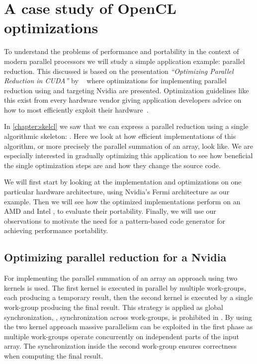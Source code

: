\section{A case study of OpenCL optimizations}
\label{sec:reduce:case-study}
\label{section:reduce:case-study}
To understand the problems of performance and portability in the context of modern parallel processors we will study a simple application example: parallel reduction.
This discussed is based on the presentation \emph{``Optimizing Parallel Reduction in CUDA''} by \citeauthor{Harris2007}~\cite{Harris2007} where optimizations for implementing parallel reduction using \CUDA and targeting Nvidia \GPUs are presented.
Optimization guidelines like this exist from every hardware vendor giving application developers advice on how to most efficiently exploit their hardware~\cite{CUDAProgrammingGuide,AMDProgrammingGuide,IntelGPUProgrammingGuide,IntelXeonProgrammingGuide}.

In \autoref{chapter:skelcl} we saw that we can express a parallel reduction using a single algorithmic skeleton: \reduce.
Here we look at how efficient \OpenCL implementations of this algorithm, or more precisely the parallel summation of an array, look like.
We are especially interested in gradually optimizing this application to see how beneficial the single optimization steps are and how they change the source code.

We will first start by looking at the implementation and optimizations on one particular hardware architecture, using Nvidia's Fermi \GPU architecture as our example.
Then we will see how the optimized implementations perform on an AMD \GPU and Intel \CPU, to evaluate their portability.
Finally, we will use our observations to motivate the need for a pattern-based code generator for achieving performance portability.


\subsection{Optimizing parallel reduction for a Nvidia \GPU}
For implementing the parallel summation of an array an approach using two \OpenCL kernels is used.
The first \OpenCL kernel is executed in parallel by multiple \OpenCL work-groups, each producing a temporary result, then the second \OpenCL kernel is executed by a single \OpenCL work-group producing the final result.
This strategy is applied as global synchronization, \ie, synchronization across work-groups, is prohibited in \OpenCL.
By using the two kernel approach massive parallelism can be exploited in the first phase as multiple work-groups operate concurrently on independent parts of the input array.
The synchronization inside the second work-group ensures correctness when computing the final result.

